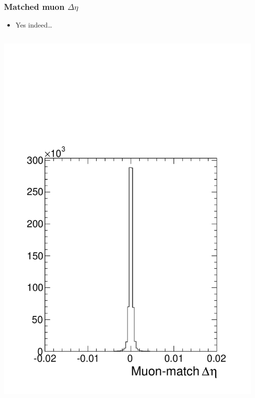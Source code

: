 \documentclass[compress]{beamer}
\begin{document}
\begin{frame}
\frametitle{Matched muon $\Delta \eta$}

\begin{itemize}
\item Yes indeed\ldots
\end{itemize}

\begin{columns}
\includegraphics[width=\linewidth]{match_deta.pdf}

\end{columns}
\end{frame}
\end{document}

